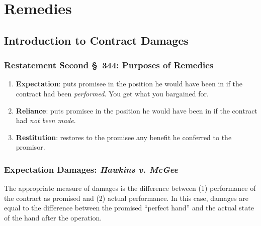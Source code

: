 \section{Remedies}

\subsection{Introduction to Contract Damages}

\subsubsection{Restatement Second \S\ 344: Purposes of Remedies}

\begin{enumerate}
    \item \textbf{Expectation}: puts promisee in the position he would have been in if 
    the contract had been \emph{performed}. You get what you bargained for.
    \item \textbf{Reliance}: puts promisee in the position he would have been in 
    if the contract had \emph{not been made}.
    \item \textbf{Restitution}: restores to the promisee any benefit he 
    conferred to the promisor.
\end{enumerate}

\subsubsection{Expectation Damages: \emph{Hawkins v. McGee}}

The appropriate measure of damages is the difference between (1) performance 
of the contract as promised and (2) actual performance. In this case, damages 
are equal to the difference between the promised ``perfect hand'' and the 
actual state of the hand after the operation.

